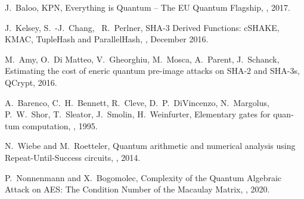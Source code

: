 \documentclass[a4paper,11pt]{article}
\begin{document}
\begin{otherlanguage}{english}
\begin{thebibliography}{1}
J.~Baloo, KPN,
\newblock Everything is Quantum – The EU Quantum Flagship, 
, 2017.

J.~Kelsey, S.~-J.~Chang, ~R.~Perlner,
\newblock SHA-3 Derived Functions: cSHAKE, KMAC, TupleHash and ParallelHash, 
, December 2016.

M.~Amy, O.~Di Matteo, V.~Gheorghiu, M.~Mosca, A.~Parent, J.~Schanck,
\newblock Estimating the cost of eneric quantum pre-image attacks on SHA-2 and SHA-3s, 
 QCrypt, 2016.

A.~Barenco, C.~H.~Bennett, R.~Cleve, D.~P.~DiVincenzo, N.~Margolus, P.~W.~Shor, T.~Sleator, J.~Smolin, H.~Weinfurter,
\newblock Elementary gates for quantum computation, 
, 1995.

N.~Wiebe and M.~Roetteler,
\newblock Quantum arithmetic and numerical analysis using Repeat-Until-Success circuits, 
, 2014.

P.~Nonnenmann and X.~Bogomolec,
\newblock Complexity of the Quantum Algebraic Attack on AES:
The Condition Number of the Macaulay Matrix, 
, 2020.
  
\end{thebibliography}



\end{otherlanguage}
\end{document}
